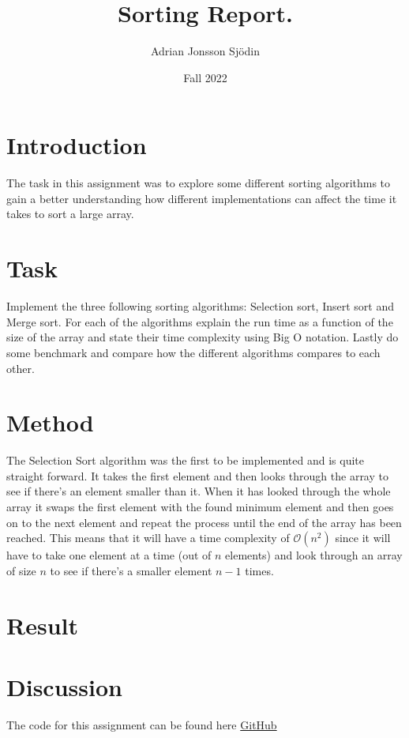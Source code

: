 \documentclass[a4paper,11pt]{article}
\begin{document}
\title{
    \textbf{Sorting Report.}
}
\author{Adrian Jonsson Sjödin}
\date{Fall 2022}

\maketitle

\section*{Introduction}
The task in this assignment was to explore some different sorting algorithms to gain a
better understanding how different implementations can affect the time it takes to sort
a large array.
\section*{Task}
Implement the three following sorting algorithms: Selection sort, Insert sort and Merge
sort. For each of the algorithms explain the run time as a function of the size of the
array and state their time complexity using Big O notation. Lastly do some benchmark and
compare how the different algorithms compares to each other.

\section*{Method}
The Selection Sort algorithm was the first to be implemented and is quite straight forward.
It takes the first element and then looks through the array to see if there's an element
smaller than it. When it has looked through the whole array it swaps the first element with
the found minimum element and then goes on to the next element and repeat the process
until the end of the array has been reached. This means that it will have a time complexity
of $\mathcal{O}(n^2)$ since it will have to take one element at a time (out of $n$ elements)
and look through an array of size $n$ to see if there's a smaller element $n-1$ times.





\section*{Result}



\section*{Discussion}



The code for this assignment can be found here \href{https://github.com/adrian-jonsson-sjoedin/ID1021-AlgoData/blob/main/Tasks/Sorting/src}{GitHub}
\end{document}
